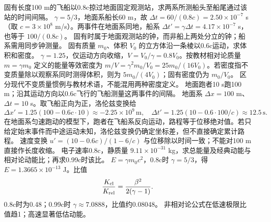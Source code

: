 \problemtext 固有长度100 m的飞船以0.8c掠过地面固定观测站，求两系所测船头至船尾通过该站的时间间隔。
\workings $\gamma=5/3$，地面系船长60 m，故 $\Delta t=60/(0.8c)=2.50\times10^{-7}$ s（取 $c=3\times10^8$ m/s）。两事件在地面系同地，船系 $\Delta t'=\gamma\Delta t=4.17\times10^{-7}$ s，也等于 $100/(0.8c)$。
\crosscheck 固有时属于地面观测站的钟，而非船上两处分立的钟；船系需用同步钟测量。
\problemtext 固有质量 $m_0$、体积 $V_0$ 的立方体沿一条棱以0.6c运动，求体积和密度。
\workings $\gamma=1.25$，仅运动方向收缩，$V=V_0/\gamma=0.8V_0$。按教材相对论质量 $m=\gamma m_0$ 定义的能量等效密度为 $m/V=\gamma^2m_0/V_0=25m_0/(16V_0)$。若密度指不变质量除以观察系同时测得体积，则为 $5m_0/(4V_0)$；固有密度仍为 $m_0/V_0$。
\crosscheck 区分现代不变质量惯例与教材术语，不能混用两种密度定义。
\problemtext 地面跑者10 s跑100 m；沿其运动方向以0.6c飞行的飞船测量这两事件的间隔。
\workings 地面系 $\Delta x=100$ m、$\Delta t=10$ s。取飞船正向为正，洛伦兹变换给
\[
\Delta x'=1.25(100-0.6c\cdot10)\approx-2.25\times10^9\,\mathrm m,\quad
\Delta t'=1.25(10-0.6\cdot100/c)\approx12.5\,\mathrm s .
\]
在地面系匀速跑动的模型下，跑者在飞船系反向运动，路程等于位移绝对值。若只给定始末事件而中途运动未知，洛伦兹变换仍确定坐标差，但不直接确定累计路程。
\crosscheck 速度变换 $u'=(10-0.6c)/(1-6/c)$ 与位移除以时间一致；不能对100 m直接作长度收缩。
\problemtext 电子速率0.8c，静质量 $9.11\times10^{-31}$ kg，求总能量及经典动能与相对论动能比；再求0.99c时该比。
\workings $E=\gamma m_0c^2$，0.8c时 $\gamma=5/3$，得 $E=1.3665\times10^{-13}$ J。比值
\[
\frac{K_{\rm cl}}{K_{\rm rel}}=\frac{\beta^2}{2(\gamma-1)}.
\]
0.8c时为0.48；0.99c时 $\gamma\approx7.0888$，比值约0.08048。
\crosscheck 非相对论公式在低速极限比值趋1；高速显著低估动能。
